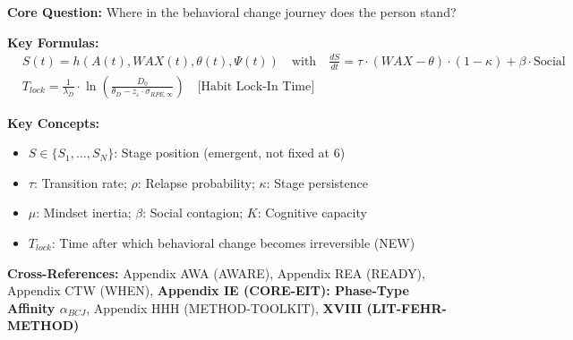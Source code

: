 \begin{tcolorbox}[colback=blue!5!white, colframe=blue!75!black,
    title=Quick Reference: CORE-STAGE]

\textbf{Core Question:} Where in the behavioral change journey does the person stand?

\textbf{Key Formulas:}
\begin{align}
&\boxed{S(t) = h(A(t), WAX(t), \theta(t), \Psi(t)) \quad \text{with} \quad \frac{dS}{dt} = \tau \cdot (WAX - \theta) \cdot (1-\kappa) + \beta \cdot \text{Social}} \\[3pt]
&\boxed{T_{lock} = \frac{1}{\lambda_D} \cdot \ln\left(\frac{D_0}{\theta_D - z_\varepsilon \cdot \sigma_{RPE,\infty}}\right) \quad \text{[Habit Lock-In Time]}}
\end{align}

\textbf{Key Concepts:}
\begin{itemize}[nosep]
\item $S \in \{S_1, \ldots, S_N\}$: Stage position (emergent, not fixed at 6)
\item $\tau$: Transition rate; $\rho$: Relapse probability; $\kappa$: Stage persistence
\item $\mu$: Mindset inertia; $\beta$: Social contagion; $K$: Cognitive capacity
\item $T_{lock}$: Time after which behavioral change becomes irreversible (NEW)
\end{itemize}

\textbf{Cross-References:} Appendix AWA (AWARE), Appendix REA (READY), Appendix CTW (WHEN), \textbf{Appendix IE (CORE-EIT): Phase-Type Affinity $\alpha_{BCJ}$}, Appendix HHH (METHOD-TOOLKIT), \textbf{XVIII (LIT-FEHR-METHOD)}
\end{tcolorbox}


